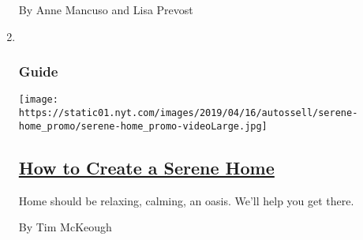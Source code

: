 \begin{enumerate}
  By Anne Mancuso and Lisa Prevost
\item ~
  \hypertarget{guide}{%
  \subsubsection{Guide}\label{guide}}

  \texttt{[image: https://static01.nyt.com/images/2019/04/16/autossell/serene-home\_promo/serene-home\_promo-videoLarge.jpg]}

  \hypertarget{how-to-create-a-serene-home}{%
  \subsection{\texorpdfstring{\href{/interactive/2019/05/15/smarter-living/serene-home.html}{How
  to Create a Serene
  Home}}{How to Create a Serene Home}}\label{how-to-create-a-serene-home}}

  Home should be relaxing, calming, an oasis. We'll help you get there.

  By Tim McKeough
\end{enumerate}

